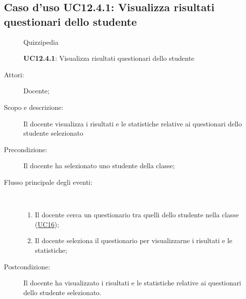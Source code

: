 \subsection{Caso d'uso UC12.4.1: Visualizza risultati questionari dello studente}
	\begin{figure}[H]
		\centering
		\begin{resizedtikzpicture}{\textwidth}
		\begin{umlsystem}[x=0, fill=lightgray!20]{Quizzipedia}
		\end{umlsystem}
		\end{resizedtikzpicture}
		\caption{\textbf{UC12.4.1}: Visualizza risultati questionari dello studente}
		\label{UC12.4.1}
	\end{figure}
\begin{description}
\item[Attori:] Docente;
\item[Scopo e descrizione:] Il docente visualizza i risultati e le statistiche relative ai questionari dello studente selezionato
      \item[Precondizione:] Il docente ha selezionato uno studente della classe;

        \item[Flusso principale degli eventi:] \ 
 \begin{enumerate}
          \item Il docente cerca un questionario tra quelli dello studente nella classe (\hyperlink{UC16}{UC16});
          \item Il docente seleziona il questionario per visualizzarne i risultati e le statistiche;

      \end{enumerate}
    \item[Postcondizione:] Il docente ha visualizzato i risultati e le statistiche relative ai questionari dello studente selezionato.
  \end{description}
\hypertarget{UC13}{}

